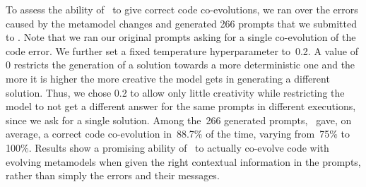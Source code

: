 To assess the ability of \LLM~to give correct code co-evolutions, %
we ran over the errors caused by the metamodel changes and generated 266 prompts that we submitted to \LLM. 
Note that we ran our original prompts asking for a single co-evolution of the code error. We further set a fixed temperature hyperparameter to~0.2. A value of 0 restricts the generation of a solution towards a more deterministic one and the more it is higher the more creative the model gets in generating a different solution. Thus, we chose 0.2 to allow only little creativity while restricting the model to not get a different answer for the same prompts in different executions, since we ask for a single solution. 
%
Among the~266 generated prompts, \LLM~gave, on average, a correct code co-evolution in~88.7\% of the time, varying from~75\% to 100\%. 
Results show a promising ability of \LLM~to actually co-evolve code with evolving metamodels when given the right contextual information in the prompts, rather than simply the errors and their messages. 



